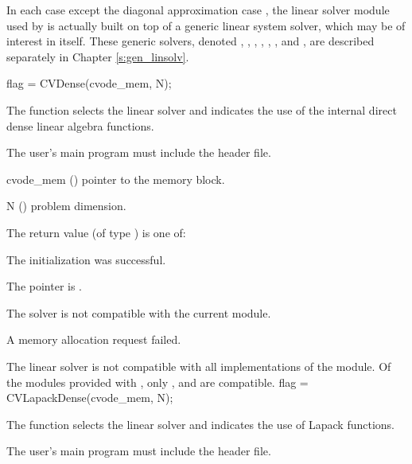 In each case except the diagonal approximation case {\cvdiag},
the linear solver module used by {\cvodes} is actually built on top of a generic
linear system solver, which may be of interest in itself.  These generic
solvers, denoted {\dense}, {\band}, {\klu}, {\superlumt}, {\spgmr}, {\spbcg},
and {\sptfqmr}, are described separately in Chapter \ref{s:gen_linsolv}.

{
  flag = CVDense(cvode\_mem, N);
}
{
  The function  selects the {\cvdense} linear solver and indicates
  the use of the internal direct dense linear algebra functions.

  The user's main program must include the  header file.
}
{
  \begin{args}
  \item[cvode\_mem] ()
    pointer to the {\cvodes} memory block.
  \item[N] ()
    problem dimension.
  \end{args}
}
{
  The return value  (of type ) is one of:
  \begin{args}
  \item[\Id{CVDLS\_SUCCESS}] 
    The {\cvdense} initialization was successful.
  \item[\Id{CVDLS\_MEM\_NULL}]
    The  pointer is .
  \item[\Id{CVDLS\_ILL\_INPUT}]
    The {\cvdense} solver is not compatible with the current {\nvector} module.
  \item[\Id{CVDLS\_MEM\_FAIL}]
    A memory allocation request failed.
  \end{args}
}
{
  The {\cvdense} linear solver is not compatible with all
  implementations of the {\nvector} module. 
  Of the {\nvector} modules provided with {\sundials}, only {\nvecs},
  {\nvecopenmp} and {\nvecpthreads} are compatible.
}
{
  flag = CVLapackDense(cvode\_mem, N);
}
{
  The function  selects the {\cvdense} linear solver and 
  indicates the use of Lapack functions. 

  The user's main program must include the  header file.
}
